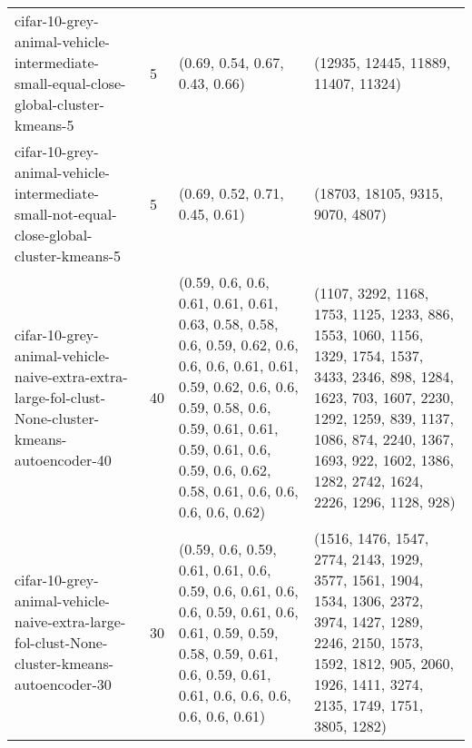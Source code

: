 \begin{longtable}{llll}
                          cifar-10-grey-animal-vehicle-intermediate-small-equal-close-global-cluster-kmeans-5 &              5 &                                                                                                                                                                                                                                                                            (0.69, 0.54, 0.67, 0.43, 0.66) &                                                                                                                                                                                                                                                                       (12935, 12445, 11889, 11407, 11324) \\
                      cifar-10-grey-animal-vehicle-intermediate-small-not-equal-close-global-cluster-kmeans-5 &              5 &                                                                                                                                                                                                                                                                            (0.69, 0.52, 0.71, 0.45, 0.61) &                                                                                                                                                                                                                                                                          (18703, 18105, 9315, 9070, 4807) \\
            cifar-10-grey-animal-vehicle-naive-extra-extra-large-fol-clust-None-cluster-kmeans-autoencoder-40 &             40 &                                                                         (0.59, 0.6, 0.6, 0.61, 0.61, 0.61, 0.63, 0.58, 0.58, 0.6, 0.59, 0.62, 0.6, 0.6, 0.6, 0.61, 0.61, 0.59, 0.62, 0.6, 0.6, 0.59, 0.58, 0.6, 0.59, 0.61, 0.61, 0.59, 0.61, 0.6, 0.59, 0.6, 0.62, 0.58, 0.61, 0.6, 0.6, 0.6, 0.6, 0.62) &                                                                 (1107, 3292, 1168, 1753, 1125, 1233, 886, 1553, 1060, 1156, 1329, 1754, 1537, 3433, 2346, 898, 1284, 1623, 703, 1607, 2230, 1292, 1259, 839, 1137, 1086, 874, 2240, 1367, 1693, 922, 1602, 1386, 1282, 2742, 1624, 2226, 1296, 1128, 928) \\
                  cifar-10-grey-animal-vehicle-naive-extra-large-fol-clust-None-cluster-kmeans-autoencoder-30 &             30 &                                                                                                                                  (0.59, 0.6, 0.59, 0.61, 0.61, 0.6, 0.59, 0.6, 0.61, 0.6, 0.6, 0.59, 0.61, 0.6, 0.61, 0.59, 0.59, 0.58, 0.59, 0.61, 0.6, 0.59, 0.61, 0.61, 0.6, 0.6, 0.6, 0.6, 0.6, 0.61) &                                                                                                                       (1516, 1476, 1547, 2774, 2143, 1929, 3577, 1561, 1904, 1534, 1306, 2372, 3974, 1427, 1289, 2246, 2150, 1573, 1592, 1812, 905, 2060, 1926, 1411, 3274, 2135, 1749, 1751, 3805, 1282) \\

\end{longtable}
